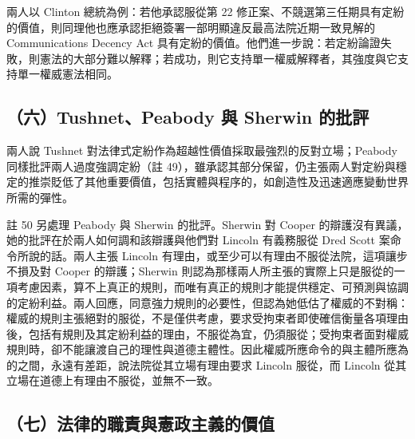 兩人以 Clinton 總統為例：若他承認服從第 22 修正案、不競選第三任期具有定紛的價值，則同理他也應承認拒絕簽署一部明顯違反最高法院近期一致見解的 Communications Decency Act 具有定紛的價值。他們進一步說：若定紛論證失敗，則憲法的大部分難以解釋；若成功，則它支持單一權威解釋者，其強度與它支持單一權威憲法相同。

\subsection{（六）Tushnet、Peabody 與 Sherwin 的批評}

兩人說 Tushnet 對法律式定紛作為超越性價值採取最強烈的反對立場；Peabody 同樣批評兩人過度強調定紛（註 49），雖承認其部分保留，仍主張兩人對定紛與穩定的推崇貶低了其他重要價值，包括實體與程序的，如創造性及迅速適應變動世界所需的彈性。

註 50 另處理 Peabody 與 Sherwin 的批評。Sherwin 對 Cooper 的辯護沒有異議，她的批評在於兩人如何調和該辯護與他們對 Lincoln 有義務服從 Dred Scott 案命令所說的話。兩人主張 Lincoln 有理由，或至少可以有理由不服從法院，這項讓步不損及對 Cooper 的辯護；Sherwin 則認為那樣兩人所主張的實際上只是服從的一項考慮因素，算不上真正的規則，而唯有真正的規則才能提供穩定、可預測與協調的定紛利益。兩人回應，同意強力規則的必要性，但認為她低估了權威的不對稱：權威的規則主張絕對的服從，不是僅供考慮，要求受拘束者即使確信衡量各項理由後，包括有規則及其定紛利益的理由，不服從為宜，仍須服從；受拘束者面對權威規則時，卻不能讓渡自己的理性與道德主體性。因此權威所應命令的與主體所應為的之間，永遠有差距，說法院從其立場有理由要求 Lincoln 服從，而 Lincoln 從其立場在道德上有理由不服從，並無不一致。

\subsection{（七）法律的職責與憲政主義的價值}

